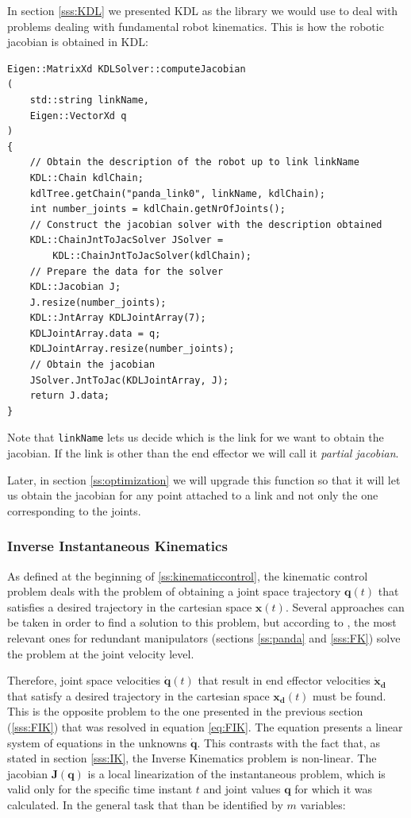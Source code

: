 In section \ref{sss:KDL} we presented KDL as the library we would use to deal with problems dealing with fundamental robot kinematics. This is how the robotic jacobian is obtained in KDL:

\begin{lstlisting}[caption={Implementation of the function \lstinline{computeJacobian}.},captionpos=b]
Eigen::MatrixXd KDLSolver::computeJacobian
(
    std::string linkName,
    Eigen::VectorXd q
)
{
    // Obtain the description of the robot up to link linkName
    KDL::Chain kdlChain;
    kdlTree.getChain("panda_link0", linkName, kdlChain);
    int number_joints = kdlChain.getNrOfJoints();
    // Construct the jacobian solver with the description obtained
    KDL::ChainJntToJacSolver JSolver =
        KDL::ChainJntToJacSolver(kdlChain);
    // Prepare the data for the solver
    KDL::Jacobian J;
    J.resize(number_joints);
    KDL::JntArray KDLJointArray(7);
    KDLJointArray.data = q;
    KDLJointArray.resize(number_joints);
    // Obtain the jacobian
    JSolver.JntToJac(KDLJointArray, J);
    return J.data;
}
\end{lstlisting}

Note that \lstinline{linkName} lets us decide which is the link for we want to obtain the jacobian. If the link is other than the end effector we will call it \textit{partial jacobian}.

Later, in section \ref{ss:optimization} we will upgrade this function so that it will let us obtain the jacobian for any point attached to a link and not only the one corresponding to the joints.

\subsubsection{Inverse Instantaneous Kinematics}
\label{sss:IIK}
As defined at the beginning of \ref{ss:kinematiccontrol}, the kinematic control problem deals with the problem of obtaining a joint space trajectory $\mathbf{q}(t)$ that satisfies a desired trajectory in the cartesian space $\mathbf{x}(t)$. Several approaches can be taken in order to find a solution to this problem, but according to \cite{siciliano1990kinematic}, the most relevant ones for redundant manipulators (sections \ref{ss:panda} and \ref{sss:FK}) solve the problem at the joint velocity level.

Therefore, joint space velocities $\mathbf{\dot{q}}(t)$ that result in end effector velocities $\mathbf{\dot{x}_{d}}$ that satisfy a desired trajectory in the cartesian space $\mathbf{x_{d}}(t)$ must be found. This is the opposite problem to the one presented in the previous section (\ref{sss:FIK}) that was resolved in equation \ref{eq:FIK}. The equation presents a linear system of equations in the unknowns ${\mathbf{\dot{q}}}$. This contrasts with the fact that, as stated in section \ref{sss:IK}, the Inverse Kinematics problem is non-linear. The jacobian ${\mathbf{J}(\mathbf{{q}})}$ is a local linearization of the instantaneous problem, which is valid only for the specific time instant $t$ and joint values $\mathbf{{q}}$ for which it was calculated. In the general task that than be identified by $m$ variables:

